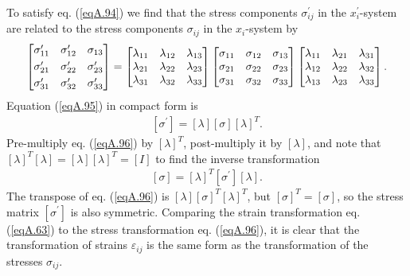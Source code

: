\documentclass{AeroStructure-ERJohnson}
\begin{document}
To satisfy eq. (\ref{eqA.94}) we find that the stress components $\sigma_{i j}^{\prime}$ in the $x_{i}^{\prime}$-system are related to the stress components $\sigma_{i j}$ in the $x_{i}$-system by
\begin{align}\label{eqA.95}
\left[\begin{array}{@{}lll@{}}\sigma_{11}^{\prime} & \sigma_{12}^{\prime} & \sigma_{13} \\[3pt]
\sigma_{21}^{\prime} & \sigma_{22}^{\prime} & \sigma_{23}^{\prime} \\[3pt]
\sigma_{31}^{\prime} & \sigma_{32}^{\prime} & \sigma_{33}^{\prime}\end{array}\right]=\left[\begin{array}{@{}lll@{}}\lambda_{11} & \lambda_{12} & \lambda_{13} \\\lambda_{21} & \lambda_{22} & \lambda_{23} \\\lambda_{31} & \lambda_{32} & \lambda_{33}\end{array}\right]\left[\begin{array}{@{}lll@{}}\sigma_{11} & \sigma_{12} & \sigma_{13} \\\sigma_{21} & \sigma_{22} & \sigma_{23} \\\sigma_{31} & \sigma_{32} & \sigma_{33}\end{array}\right]\left[\begin{array}{@{}lll@{}}\lambda_{11} & \lambda_{21} & \lambda_{31} \\\lambda_{12} & \lambda_{22} & \lambda_{32} \\\lambda_{13} & \lambda_{23} & \lambda_{33}\end{array}\right].
\end{align}
Equation (\ref{eqA.95}) in compact form is
\begin{align}\label{eqA.96}
[\sigma^{\prime}]=[\lambda][\sigma][\lambda]^{T}.
\end{align}
Pre-multiply eq. (\ref{eqA.96}) by $[\lambda]^{T}$, post-multiply it by $[\lambda]$, and note that $[\lambda]^{T}[\lambda]=[\lambda][\lambda]^{T}=[I]$ to find the inverse transformation
\begin{align}\label{eqA.97}
[\sigma]=[\lambda]^{T}[\sigma^{\prime}][\lambda].
\end{align}
The transpose of eq. (\ref{eqA.96}) is $[\lambda][\sigma]^{T}[\lambda]^{T}$, but $[\sigma]^{T}=[\sigma]$, so the stress matrix $[\sigma^{\prime}]$ is also symmetric. Comparing the strain transformation eq. (\ref{eqA.63}) to the stress transformation eq. (\ref{eqA.96}), it is clear that the transformation of strains $\varepsilon_{ij}$ is the same form as the transformation of the stresses $\sigma_{ij}$.
\end{document}

